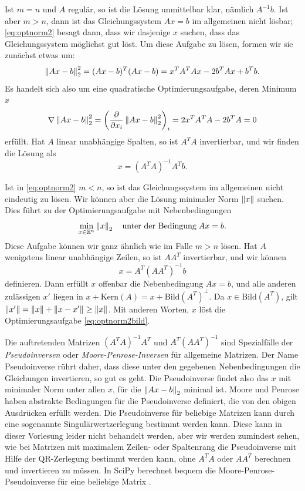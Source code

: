 Ist $m = n$ und $A$ regulär, so ist die Lösung unmittelbar klar,
nämlich $A^{-1}b$. Ist aber $m>n$, dann ist das Gleichungssystem
$Ax=b$ im allgemeinen nicht lösbar; \eqref{eq:optnorm2} besagt dann,
dass wir dasjenige $x$ suchen, dass das Gleichungssystem möglichst gut
löst. Um diese Aufgabe zu lösen, formen wir sie zunächst etwas um:
\begin{equation}
  \left\lVert{Ax - b}\right\rVert^2_2 = (Ax - b)^T(Ax - b)
  = x^TA^TAx - 2b^TAx + b^Tb.
\end{equation}
Es handelt sich also um eine quadratische Optimierungsaufgabe, deren
Minimum $x$
\begin{equation}
  \nabla \left\lVert{Ax - b}\right\rVert^2_2 = \left(\frac{\partial}{\partial x_i} \left\lVert{Ax -
    b}\right\rVert^2_2\right)_i = 2x^TA^TA - 2b^TA = 0
\end{equation}
erfüllt. Hat $A$ linear unabhängige Spalten, so ist $A^TA$ invertierbar,
und wir finden die Lösung als
\begin{equation}
  x = (A^TA)^{-1}A^Tb.
\end{equation}

Ist in \eqref{eq:optnorm2} $m < n$, so ist das Gleichungssystem im
allgemeinen nicht eindeutig zu lösen. Wir können aber die Lösung
minimaler Norm $\left\lVert{x}\right\rVert$ suchen. Dies führt zu der
Optimierungsaufgabe mit Nebenbedingungen
\begin{equation}
  \label{eq:optnorm2bild}
  \min_{x\in\mathbb{R}^n} \left\lVert{x}\right\rVert_2\quad\text{unter der Bedingung}\; Ax=b.
\end{equation}
Diese Aufgabe können wir ganz ähnlich wie im Falle $m>n$ lösen. Hat
$A$ wenigstens linear unabhängige Zeilen, so ist $AA^T$ invertierbar,
und wir können
\begin{equation}
  x = A^T(AA^T)^{-1}b
\end{equation}
definieren. Dann erfüllt $x$ offenbar die Nebenbedingung $Ax=b$, und
alle anderen zulässigen $x'$ liegen in $x + \text{Kern}(A) = x +
\text{Bild}(A^T)^\perp$. Da $x\in\text{Bild}(A^T)$, gilt
$\left\lVert{x'}\right\rVert=\left\lVert{x}\right\rVert + \left\lVert{x-x'}\right\rVert\ge \left\lVert{x}\right\rVert$. Mit anderen Worten,
$x$ löst die Optimierungsaufgabe \eqref{eq:optnorm2bild}.

Die auftretenden Matrizen $(A^TA)^{-1}A^T$ und $A^T(AA^T)^{-1}$ sind
Spezialfälle der \emph{Pseudoinversen} oder
\emph{Moore-Penrose-Inversen} für allgemeine Matrizen. Der Name
Pseudoinverse rührt daher, dass diese unter den gegebenen
Nebenbedingungen die Gleichungen invertieren, so gut es geht. Die
Pseudoinverse findet also das $x$ mit minimaler Norm unter allen $x$,
für die $\left\lVert{Ax-b}\right\rVert_2$ minimal ist.  Moore und Penrose haben
abstrakte Bedingungen für die Pseudoinverse definiert, die von den
obigen Ausdrücken erfüllt werden. Die Pseudoinverse für beliebige
Matrizen kann durch eine sogenannte Singulärwertzerlegung bestimmt
werden kann. Diese kann in dieser Vorlesung leider nicht behandelt
werden, aber wir werden zumindest sehen, wie bei Matrizen mit
maximalem Zeilen- oder Spaltenrang die Pseudoinverse mit Hilfe
der QR-Zerlegung bestimmt werden kann, ohne $A^TA$ oder $AA^T$
berechnen und invertieren zu müssen. In SciPy berechnet
 bequem die Moore-Penrose-Pseudoinverse
für eine beliebige Matrix .

